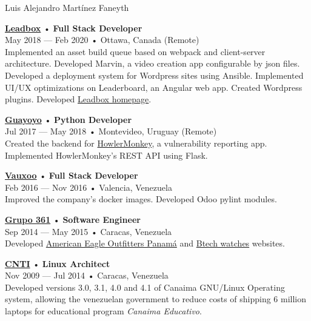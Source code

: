 \documentclass[12pt]{article}
\begin{document}
\begin{cv}{Luis Alejandro Mart\'inez Faneyth}
\begin{minipage}[t]{0.55\textwidth}
{    }\vspace{0.125em}
    \parbox[t]{\linewidth}{
      \textbf{\href{http://leadboxhq.com}{Leadbox}} • \textrm{\textbf{Full Stack Developer}}\\
      May 2018 --- Feb 2020 • Ottawa, Canada (Remote)\\
      \footnotesize{Implemented an asset build queue based on webpack and client-server architecture. Developed Marvin, a video creation app configurable by json files. Developed a deployment system for Wordpress sites using Ansible. Implemented UI/UX optimizations on Leaderboard, an Angular web app. Created Wordpress plugins. Developed \href{https://leadboxhq.com}{Leadbox homepage}.}\\
    }\vspace{0.125em}
    \parbox[t]{\linewidth}{
      \textbf{\href{https://guayoyo.io}{Guayoyo}} • \textrm{\textbf{Python Developer}}\\
      Jul 2017 --- May 2018 • Montevideo, Uruguay (Remote)\\
      \footnotesize{Created the backend for \href{https://howlermonkey.io}{HowlerMonkey}, a vulnerability reporting app. Implemented HowlerMonkey's REST API using Flask.}\\
    }\vspace{0.125em}
    \parbox[t]{\linewidth}{
      \textbf{\href{https://www.vauxoo.com}{Vauxoo}} • \textrm{\textbf{Full Stack Developer}}\\
      Feb 2016 --- Nov 2016 • Valencia, Venezuela\\
      \footnotesize{Improved the company's docker images. Developed Odoo pylint modules.}\\
    }\vspace{0.125em}
    \parbox[t]{\linewidth}{
      \textbf{\href{https://web.archive.org/web/20180322024522/http://grupo361.com/}{Grupo 361}} • \textrm{\textbf{Software Engineer}}\\
      Sep 2014 --- May 2015 • Caracas, Venezuela\\
      \footnotesize{Developed \href{https://web.archive.org/web/20160219152855/http://www.aeo.com.pa/}{American Eagle Outfitters Panamá} and \href{https://web.archive.org/web/20150720121500/http://www.btechwatches.com/}{Btech watches} websites.}\\
    }\vspace{0.125em}
    \parbox[t]{\linewidth}{
      \textbf{\href{https://www.cnti.gob.ve}{CNTI}} • \textrm{\textbf{Linux Architect}}\\
      Nov 2009 --- Jul 2014 • Caracas, Venezuela\\
      \footnotesize{Developed versions 3.0, 3.1, 4.0 and 4.1 of Canaima GNU/Linux Operating system, allowing the venezuelan government to reduce costs of shipping 6 million laptops for educational program \textsl{Canaima Educativo}.}\\
    }
  \end{minipage}

\end{cv}
\end{document}
